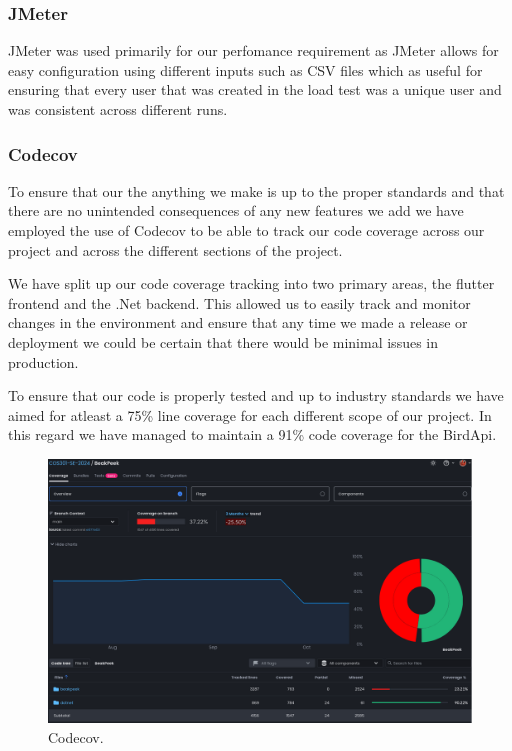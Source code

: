 \documentclass[a4paper]{article}
\begin{document}
\subsubsection{JMeter}

JMeter was used primarily for our perfomance requirement as JMeter allows for easy configuration
using different inputs such as CSV files which as useful for ensuring that every user that 
was created in the load test was a unique user and was consistent across different runs.

\subsubsection{Codecov}
To ensure that our the anything we make is up to the proper standards and that 
there are no unintended consequences of any new features we add we have employed
the use of Codecov to be able to track our code coverage across our project and 
across the different sections of the project.
\newline

We have split up our code coverage tracking into two primary areas, the flutter frontend and the 
.Net backend. This allowed us to easily track and monitor changes in the environment and ensure
that any time we made a release or deployment we could be certain that there would be minimal 
issues in production.

To ensure that our code is properly tested and up to industry standards we have
aimed for atleast a 75\%  line coverage for each different scope of our project.
\newline
In this regard we have managed to maintain a 91\% code coverage for the BirdApi.

\begin{figure}[h]
  \includegraphics[width=\linewidth]{../Assets/codecov.png}
  \caption{Codecov.}
  \label{fig:load graphs}
\end{figure}
\end{document}
